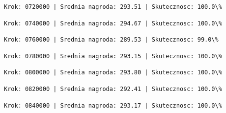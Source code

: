 \documentclass[11pt]{article}
\begin{document}
    
    
    \begin{Verbatim}[commandchars=\\\{\}]
Krok: 0720000 | Srednia nagroda: 293.51 | Skutecznosc: 100.0\%

    \end{Verbatim}

    
    
    \begin{Verbatim}[commandchars=\\\{\}]
Krok: 0740000 | Srednia nagroda: 294.67 | Skutecznosc: 100.0\%

    \end{Verbatim}

    
    
    \begin{Verbatim}[commandchars=\\\{\}]
Krok: 0760000 | Srednia nagroda: 289.53 | Skutecznosc: 99.0\%

    \end{Verbatim}

    
    
    \begin{Verbatim}[commandchars=\\\{\}]
Krok: 0780000 | Srednia nagroda: 293.15 | Skutecznosc: 100.0\%

    \end{Verbatim}

    
    
    \begin{Verbatim}[commandchars=\\\{\}]
Krok: 0800000 | Srednia nagroda: 293.80 | Skutecznosc: 100.0\%

    \end{Verbatim}

    
    
    \begin{Verbatim}[commandchars=\\\{\}]
Krok: 0820000 | Srednia nagroda: 292.41 | Skutecznosc: 100.0\%

    \end{Verbatim}

    
    
    \begin{Verbatim}[commandchars=\\\{\}]
Krok: 0840000 | Srednia nagroda: 293.17 | Skutecznosc: 100.0\%

    \end{Verbatim}
\end{document}
